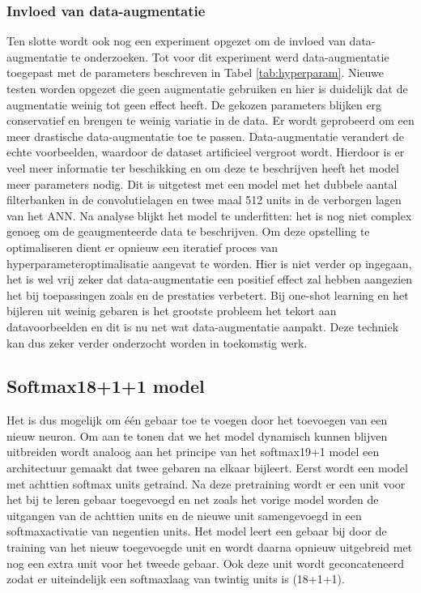 \subsubsection{Invloed van data-augmentatie}
Ten slotte wordt ook nog een experiment opgezet om de invloed van data-augmentatie te onderzoeken. Tot voor dit experiment werd data-augmentatie toegepast met de parameters beschreven in Tabel \ref{tab:hyperparam}. Nieuwe testen worden opgezet die geen augmentatie gebruiken en hier is duidelijk dat de augmentatie weinig tot geen effect heeft. De gekozen parameters blijken erg conservatief en brengen te weinig variatie in de data. Er wordt geprobeerd om een meer drastische data-augmentatie toe te passen. Data-augmentatie verandert de echte voorbeelden, waardoor de dataset artificieel vergroot wordt. Hierdoor is er veel meer informatie ter beschikking en om deze te  beschrijven heeft het model meer parameters nodig.
\npar Dit is uitgetest met een model met het dubbele aantal filterbanken in de convolutielagen en twee maal 512 units in de verborgen lagen van het ANN. Na analyse blijkt het model te underfitten: het is nog niet complex genoeg om de geaugmenteerde data te beschrijven. Om deze opstelling te optimaliseren dient er opnieuw een iteratief proces van hyperparameteroptimalisatie aangevat te worden. Hier is niet verder op ingegaan, het is wel vrij zeker dat data-augmentatie een positief effect zal hebben aangezien het bij toepassingen zoals  \cite{cnn-krizhevsky} en \cite{cnn-karpathy} de prestaties verbetert. Bij one-shot learning en het bijleren uit weinig gebaren is het grootste probleem het tekort aan datavoorbeelden en dit is nu net wat data-augmentatie aanpakt. Deze techniek kan dus zeker verder onderzocht worden in toekomstig werk.

\subsection{Softmax18+1+1 model}\label{sec:softmax18x2}
Het is dus mogelijk om \'e\'en gebaar toe te voegen door het toevoegen van een nieuw neuron. Om aan te tonen dat we het model dynamisch kunnen blijven uitbreiden wordt analoog aan het principe van het softmax19+1 model een architectuur gemaakt dat twee gebaren na elkaar bijleert. Eerst wordt een model met achttien softmax units getraind. Na deze pretraining wordt er een unit voor het bij te leren gebaar toegevoegd en net zoals het vorige model worden de uitgangen van de achttien units en de nieuwe unit samengevoegd in een softmaxactivatie van negentien units.
\npar Het model leert een gebaar bij door de training van het nieuw toegevoegde unit en wordt daarna opnieuw uitgebreid met nog een extra unit voor het tweede gebaar. Ook deze unit wordt geconcateneerd zodat er uiteindelijk een softmaxlaag van twintig units is (18+1+1).

